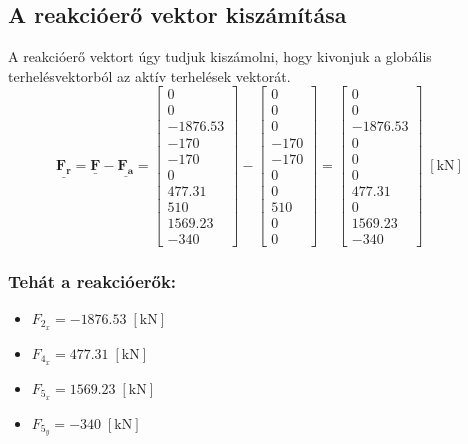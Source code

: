 \documentclass[12pt,a4paper]{article}
\def\vec#1{\underline{\mathbf{#1}}}
\def\kN{\; \left[\mathrm{kN}\right]}
\begin{document}
\subsection{A reakcióerő vektor kiszámítása}
A reakcióerő vektort úgy tudjuk kiszámolni, hogy kivonjuk a globális
terhelésvektorból az aktív terhelések vektorát.
\begin{equation}
    \vec{F_r}=\vec{F}-\vec{F_a}=
    \begin{bmatrix}
        0        \\
        0        \\
        -1876.53 \\
        -170     \\
        -170     \\
        0        \\
        477.31   \\
        510      \\
        1569.23  \\
        -340
    \end{bmatrix}-
    \begin{bmatrix}
        0    \\
        0    \\
        0    \\
        -170 \\
        -170 \\
        0    \\
        0    \\
        510  \\
        0    \\
        0
    \end{bmatrix}=
    \begin{bmatrix}
        0        \\
        0        \\
        -1876.53 \\
        0        \\
        0        \\
        0        \\
        477.31   \\
        0        \\
        1569.23  \\
        -340
    \end{bmatrix} \kN
\end{equation}
\subsubsection*{Tehát a reakcióerők:}
\begin{multicols}{2}
    \begin{itemize}
        \item $F_{2_x}= -1876.53 \kN$
        \item $F_{4_x}=477.31 \kN$
    \end{itemize}
    \columnbreak
    \begin{itemize}
        \item $F_{5_x}= 1569.23 \kN$
        \item $F_{5_y}= -340 \kN$
    \end{itemize}
\end{multicols}
\end{document}
